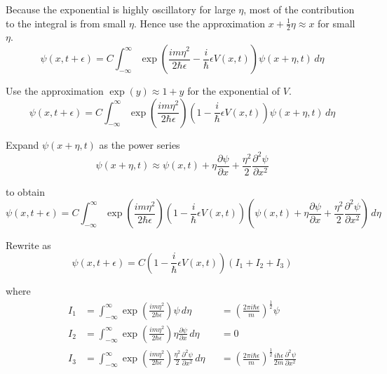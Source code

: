 Because the exponential is highly oscillatory for large $\eta$,
most of the contribution to the integral is from small $\eta$.
Hence use the approximation $x+\tfrac{1}{2}\eta\approx x$ for small $\eta$.
\begin{equation*}
\psi(x,t+\epsilon)=C\int_{-\infty}^\infty
\exp\left(\frac{im\eta^2}{2\hbar\epsilon}
-\frac{i}{\hbar}\epsilon V(x,t)\right)\psi(x+\eta,t)\,d\eta
\end{equation*}

Use the approximation $\exp(y)\approx1+y$ for the exponential of $V$.
\begin{equation*}
\psi(x,t+\epsilon)=C\int_{-\infty}^\infty
\exp\left(\frac{im\eta^2}{2\hbar\epsilon}\right)
\left(1-\frac{i}{\hbar}\epsilon V(x,t)\right)
\psi(x+\eta,t)\,d\eta
\end{equation*}

Expand $\psi(x+\eta,t)$ as the power series
\begin{equation*}
\psi(x+\eta,t)\approx\psi(x,t)+\eta\frac{\partial\psi}{\partial x}
+\frac{\eta^2}{2}\frac{\partial^2\psi}{\partial x^2}
\end{equation*}

to obtain
\begin{equation*}
\psi(x,t+\epsilon)=C\int_{-\infty}^\infty
\exp\left(\frac{im\eta^2}{2\hbar\epsilon}\right)
\left(1-\frac{i}{\hbar}\epsilon V(x,t)\right)
\left(\psi(x,t)+\eta\frac{\partial\psi}{\partial x}
+\frac{\eta^2}{2}\frac{\partial^2\psi}{\partial x^2}\right)
\,d\eta
\end{equation*}

Rewrite as
\begin{equation*}
\psi(x,t+\epsilon)=C\left(1-\frac{i}{\hbar}\epsilon V(x,t)\right)(I_1+I_2+I_3)
\end{equation*}

where
\begin{align*}
I_1&=\int_{-\infty}^\infty\exp\left(\frac{im\eta^2}{2\hbar\epsilon}\right)\psi
\,d\eta
& &=\left(\frac{2\pi i\hbar\epsilon}{m}\right)^\frac{1}{2}\psi
\\
I_2&=\int_{-\infty}^\infty
\exp\left(\frac{im\eta^2}{2\hbar\epsilon}\right)
\eta\frac{\partial\psi}{\partial x}
\,d\eta
& &=0
\\
I_3&=\int_{-\infty}^\infty
\exp\left(\frac{im\eta^2}{2\hbar\epsilon}\right)
\frac{\eta^2}{2}\frac{\partial^2\psi}{\partial x^2}
\,d\eta
& &=\left(\frac{2\pi i\hbar\epsilon}{m}\right)^\frac{1}{2}
\frac{i\hbar\epsilon}{2m}\frac{\partial^2\psi}{\partial x^2}
\end{align*}

